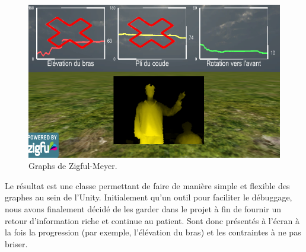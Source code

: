 \documentclass[french,12pt]{report}
\begin{document}
\begin{figure}[h!]
\centering
\includegraphics[width=\linewidth]{images/zfm_graph}
\caption{Graphs de Zigful-Meyer.}
\end{figure}

Le résultat est une classe permettant de faire de manière simple et flexible des
graphes au sein de l'Unity. Initialement qu'un outil pour faciliter le 
débuggage, nous avons finalement décidé de les garder dans le projet à fin de
fournir un retour d'information riche et continue au patient. Sont donc présentés 
à l'écran à la fois la progression (par exemple, l'élévation du bras) et les 
contraintes à ne pas briser.
		
\end{document}
